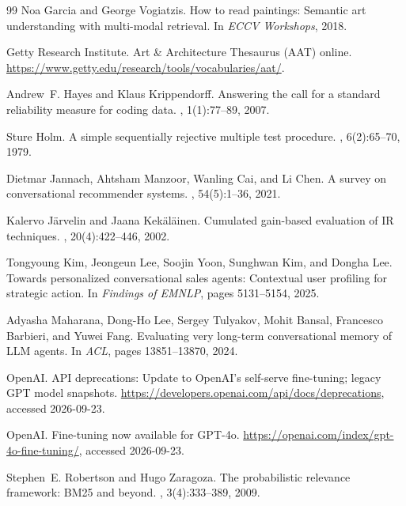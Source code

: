 \documentclass[10pt,twocolumn,letterpaper]{article}
\begin{document}
\begin{thebibliography}{99}
Noa Garcia and George Vogiatzis.
\newblock How to read paintings: Semantic art understanding with multi-modal retrieval.
\newblock In {\em ECCV Workshops}, 2018.

Getty Research Institute.
\newblock Art \& Architecture Thesaurus (AAT) online.
\newblock \url{https://www.getty.edu/research/tools/vocabularies/aat/}.

Andrew~F. Hayes and Klaus Krippendorff.
\newblock Answering the call for a standard reliability measure for coding data.
, 1(1):77--89, 2007.

Sture Holm.
\newblock A simple sequentially rejective multiple test procedure.
, 6(2):65--70, 1979.

Dietmar Jannach, Ahtsham Manzoor, Wanling Cai, and Li Chen.
\newblock A survey on conversational recommender systems.
, 54(5):1--36, 2021.

Kalervo J{\"a}rvelin and Jaana Kek{\"a}l{\"a}inen.
\newblock Cumulated gain-based evaluation of IR techniques.
, 20(4):422--446, 2002.

Tongyoung Kim, Jeongeun Lee, Soojin Yoon, Sunghwan Kim, and Dongha Lee.
\newblock Towards personalized conversational sales agents: Contextual user profiling for strategic action.
\newblock In {\em Findings of EMNLP}, pages 5131--5154, 2025.

Adyasha Maharana, Dong-Ho Lee, Sergey Tulyakov, Mohit Bansal, Francesco Barbieri, and Yuwei Fang.
\newblock Evaluating very long-term conversational memory of LLM agents.
\newblock In {\em ACL}, pages 13851--13870, 2024.

OpenAI.
\newblock API deprecations: Update to OpenAI's self-serve fine-tuning; legacy GPT model snapshots.
\newblock \url{https://developers.openai.com/api/docs/deprecations}, accessed 2026-09-23.

OpenAI.
\newblock Fine-tuning now available for GPT-4o.
\newblock \url{https://openai.com/index/gpt-4o-fine-tuning/}, accessed 2026-09-23.

Stephen~E. Robertson and Hugo Zaragoza.
\newblock The probabilistic relevance framework: BM25 and beyond.
, 3(4):333--389, 2009.


\end{thebibliography}
\end{document}
